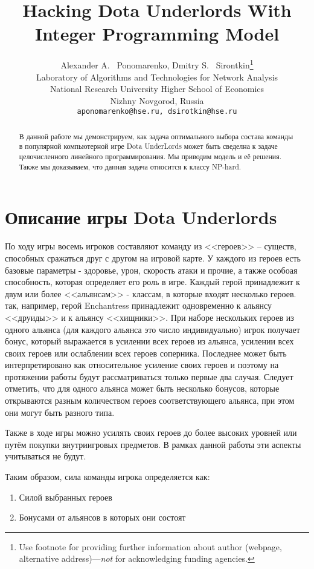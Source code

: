 \documentclass{article}
\title{Hacking Dota Underlords With Integer Programming Model}
\author{
  Alexander A. ~Ponomarenko, Dmitry S. ~Sirontkin\thanks{Use footnote for providing further
    information about author (webpage, alternative
    address)---\emph{not} for acknowledging funding agencies.} \\
  Laboratory of Algorithms and Technologies for Network Analysis\\
  National Research University Higher School of Economics \\
  Nizhny Novgorod, Russia\\
  \texttt{aponomarenko@hse.ru, dsirotkin@hse.ru} \\
}
\begin{document}
\maketitle

\begin{abstract}
В данной работе мы демонстрируем, как задача оптимального выбора состава команды в популярной компьютерной игре Dota UnderLords может быть сведелна к задаче целочисленного линейного программирования. Мы приводим модель и её решения. Также мы доказываем, что данная задача относится к классу NP-hard. 
\end{abstract}




\section{Описание игры Dota Underlords}

По ходу игры восемь игроков составляют команду из <<героев>> – существ, способных сражаться друг с другом на игровой карте. У каждого из героев есть базовые параметры - здоровье, урон, скорость атаки и прочие, а также особоая способность, которая определяет его роль в игре. Каждый герой принадлежит к двум или более <<альянсам>> - классам, в которые входят несколько героев. так, например, герой Enchantress принадлежит одновременно к альянсу <<друиды>> и к альянсу <<хищники>>. При наборе нескольких героев из одного альянса (для каждого альянса это число индивидуально) игрок получает бонус, который выражается в усилении всех героев из альянса, усилении всех своих героев или ослаблении всех героев соперника. Последнее может быть интерпретировано как относительное усиление своих героев и поэтому на протяжении работы будут рассматриваться только первые два случая. Следует отметить, что для одного альянса может быть несколько бонусов, которые открываются разным количеством героев соответствующего альянса, при этом они могут быть разного типа.

Также в ходе игры можно усилять своих героев до более высоких уровней или путём покупки внутриигровых предметов. В рамках данной работы эти аспекты учитываться не будут.

Таким образом, сила команды игрока определяется как:

\begin{enumerate}
    \item Силой выбранных героев
    \item Бонусами от альянсов в которых они состоят
\end{enumerate}
\end{document}
